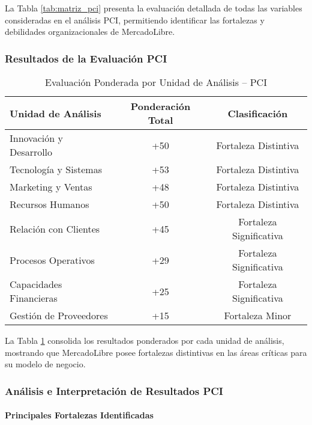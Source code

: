 La Tabla \ref{tab:matriz_pci} presenta la evaluación detallada de todas las variables consideradas en el análisis PCI, permitiendo identificar las fortalezas y debilidades organizacionales de MercadoLibre.

\subsubsection{Resultados de la Evaluación PCI}

\begin{table}[H]
\centering
\begin{tabular}{|l|c|c|}
\hline
\textbf{Unidad de Análisis} & \textbf{Ponderación Total} & \textbf{Clasificación} \\
\hline
Innovación y Desarrollo & +50 & Fortaleza Distintiva \\
\hline
Tecnología y Sistemas & +53 & Fortaleza Distintiva \\
\hline
Marketing y Ventas & +48 & Fortaleza Distintiva \\
\hline
Recursos Humanos & +50 & Fortaleza Distintiva \\
\hline
Relación con Clientes & +45 & Fortaleza Significativa \\
\hline
Procesos Operativos & +29 & Fortaleza Significativa \\
\hline
Capacidades Financieras & +25 & Fortaleza Significativa \\
\hline
Gestión de Proveedores & +15 & Fortaleza Minor \\
\hline
\end{tabular}
\caption{Evaluación Ponderada por Unidad de Análisis -- PCI}
\label{tab:resultados_pci}
\end{table}

La Tabla \ref{tab:resultados_pci} consolida los resultados ponderados por cada unidad de análisis, mostrando que MercadoLibre posee fortalezas distintivas en las áreas críticas para su modelo de negocio.

\subsubsection{Análisis e Interpretación de Resultados PCI}

\paragraph{Principales Fortalezas Identificadas}

